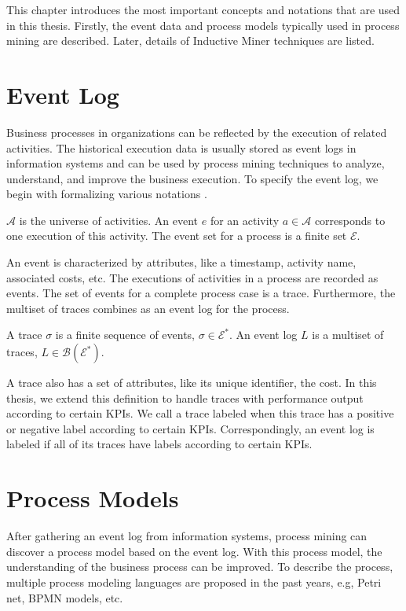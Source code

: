 This chapter introduces the most important concepts and notations that are used in this thesis. Firstly, the event data and process models typically used in process mining are described. Later, details of Inductive Miner techniques  are listed.
\section{Event Log}
Business processes in organizations can be reflected by the execution of related activities. The historical execution data is usually stored as event logs in information systems and can be used by process mining techniques to analyze, understand, and improve the business execution. To specify the event log, we begin with formalizing  various notations \cite{van2016data} .
\begin{definition}[Event]
$\mathcal{A}$ is the universe of activities. An event $e$ for an activity  $a \in \mathcal{A}$ corresponds to one execution of this activity. The event set for a process is a finite set $\mathcal{E}$. 
\end{definition}
An event is characterized by attributes, like a timestamp, activity name, associated costs, etc. The executions of activities in a process are recorded as events. The set of events for a complete process case is a trace. Furthermore, the multiset of traces combines as an event log for the process. 


\begin{definition}
A trace $\sigma$ is a finite sequence of events, $\sigma \in \mathcal{E}^*$. An event log $L$ is a multiset of traces, $L \in \mathcal{B(\mathcal{E}^*)}$. 
\end{definition}
A trace also has a set of attributes, like its unique identifier, the cost. In this thesis, we extend this definition to handle traces with performance output according to certain KPIs. We call a trace labeled when this trace has a positive or negative label according to certain KPIs. Correspondingly, an event log is labeled if all of its traces have labels according to certain KPIs.
\section{Process Models}
After gathering an event log from information systems, process mining can discover a process model based on the event log. With this process model, the understanding of the business process can be improved. To describe the process, multiple process modeling languages are proposed in the past years, e.g, Petri net, BPMN models, etc. 

